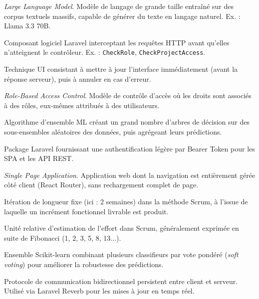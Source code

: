 \begin{description}[leftmargin=3.5cm,style=nextline]
  \item[LLM]
    \textit{Large Language Model}. Modèle de langage de grande taille entraîné
    sur des corpus textuels massifs, capable de générer du texte en langage naturel.
    Ex. : Llama 3.3 70B.

  \item[Middleware]
    Composant logiciel Laravel interceptant les requêtes HTTP avant qu'elles
    n'atteignent le contrôleur. Ex. : \texttt{CheckRole}, \texttt{CheckProjectAccess}.

  \item[Optimistic Update]
    Technique UI consistant à mettre à jour l'interface immédiatement (avant la
    réponse serveur), puis à annuler en cas d'erreur.

  \item[RBAC]
    \textit{Role-Based Access Control}. Modèle de contrôle d'accès où les droits
    sont associés à des rôles, eux-mêmes attribués à des utilisateurs.

  \item[Random Forest]
    Algorithme d'ensemble ML créant un grand nombre d'arbres de décision sur des
    sous-ensembles aléatoires des données, puis agrégeant leurs prédictions.

  \item[Sanctum]
    Package Laravel fournissant une authentification légère par Bearer Token pour
    les SPA et les API REST.

  \item[SPA]
    \textit{Single Page Application}. Application web dont la navigation est
    entièrement gérée côté client (React Router), sans rechargement complet de page.

  \item[Sprint]
    Itération de longueur fixe (ici : 2 semaines) dans la méthode Scrum, à l'issue
    de laquelle un incrément fonctionnel livrable est produit.

  \item[Story Points]
    Unité relative d'estimation de l'effort dans Scrum, généralement exprimée en
    suite de Fibonacci (1, 2, 3, 5, 8, 13...).

  \item[VotingClassifier]
    Ensemble Scikit-learn combinant plusieurs classifieurs par vote pondéré
    (\textit{soft voting}) pour améliorer la robustesse des prédictions.

  \item[WebSocket]
    Protocole de communication bidirectionnel persistent entre client et serveur.
    Utilisé via Laravel Reverb pour les mises à jour en temps réel.

\end{description}

